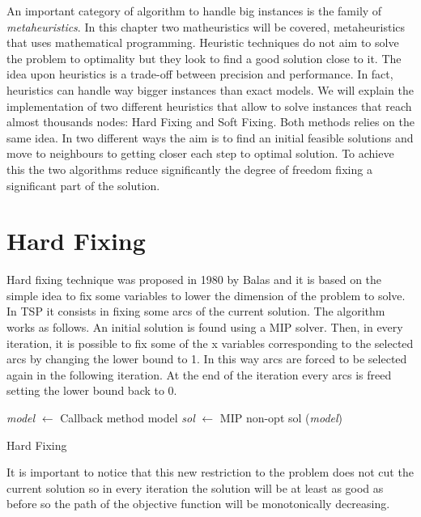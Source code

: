An important category of algorithm to handle big instances is the family of
\emph{metaheuristics}. In this chapter two matheuristics will be covered,
metaheuristics that uses mathematical programming. Heuristic techniques do not
aim to solve the problem to optimality but they look to find a good solution
close to it. The idea upon heuristics is a trade-off between precision and
performance. In fact, heuristics can handle way bigger instances than exact
models. We will explain the implementation of two different heuristics that
allow to solve instances that reach almost thousands nodes: Hard Fixing and Soft
Fixing. Both methods relies on the same idea. In two different ways the aim is
to find an initial feasible solutions and move to neighbours to getting closer
each step to optimal solution. To achieve this the two algorithms reduce
significantly the degree of freedom fixing a significant part of the solution. 

\section{Hard Fixing}
Hard fixing technique was proposed in 1980 by Balas \cite{balas1980pivot} and it is based on the simple idea to fix some variables to lower the dimension of the problem to solve. In TSP it consists in fixing some arcs of the current solution. The algorithm works as follows. An initial solution is found using a MIP solver. Then, in every iteration, it is possible to fix some of the x variables corresponding to the selected arcs by changing the lower bound to 1. In this way arcs are forced to be selected again in the following iteration. At the end of the iteration every arcs is freed setting the lower bound back to 0.


\begin{algorithm}[H]
\SetAlgoLined
{}
    \emph{model} $\leftarrow$ Callback method model\;
    \emph{sol} $\leftarrow$ MIP non-opt sol (\emph{model})\;
    \caption{Hard Fixing}
\end{algorithm}

It is important to notice that this new restriction to the problem does not cut the current solution so in every iteration the solution will be at least as good as before so the path of the objective function will be monotonically decreasing.

